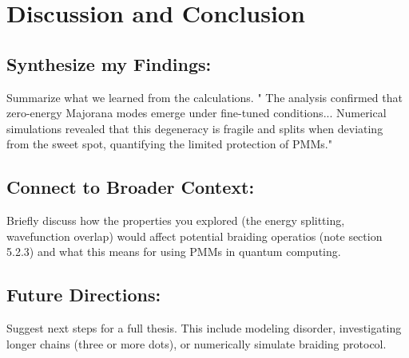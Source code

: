 \documentclass[11pt, letterpaper, titlepage]{article}
\begin{document}
\section{Discussion and Conclusion}
\subsection{Synthesize my Findings:} Summarize what we learned from the calculations. " The analysis confirmed that zero-energy Majorana modes emerge under fine-tuned conditions... Numerical simulations revealed that this degeneracy is fragile and splits when deviating from the sweet spot, quantifying the limited protection of PMMs."\\
\subsection{Connect to Broader Context:} Briefly discuss how the properties you explored (the energy splitting, wavefunction overlap) would affect potential braiding operatios (note section 5.2.3) and what this means for using PMMs in quantum computing.\\
\subsection{Future Directions:} Suggest next steps for a full thesis. This include modeling disorder, investigating longer chains (three or more dots), or numerically simulate braiding protocol.
\end{document}
